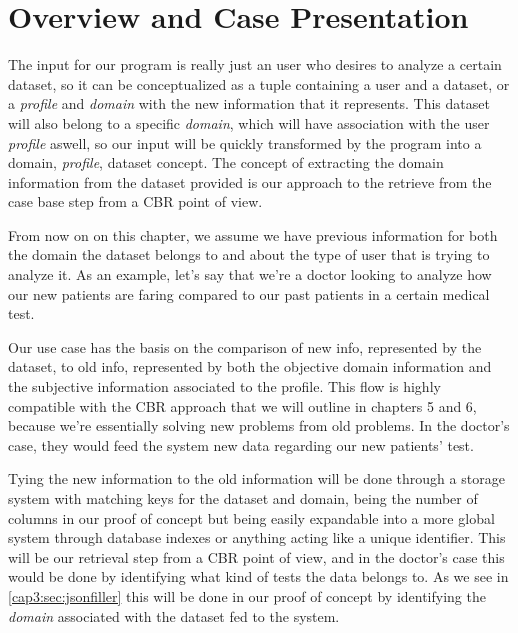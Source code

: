 \section{Overview and Case Presentation}
\label{cap2:sec:preparation}
The input for our program is really just an user who desires to analyze a certain dataset, so it can be conceptualized as a tuple containing a user and a dataset, or a \textit{profile} and \textit{domain} with the new information that it represents. This dataset will also belong to a specific \textit{domain}, which will have association with the user \textit{profile} aswell, so our input will be quickly transformed by the program into a domain, \textit{profile}, dataset concept. The concept of extracting the domain information from the dataset provided is our approach to the retrieve from the case base step from a CBR point of view.

From now on on this chapter, we assume we have previous information for both the domain the dataset belongs to and about the type of user that is trying to analyze it.
As an example, let's say that we're a doctor looking to analyze how our new patients are faring compared to our past patients in a certain medical test.

Our use case has the basis on the comparison of new info, represented by the dataset, to old info, represented by both the objective domain information and the subjective information associated to the profile. This flow is highly compatible with the CBR approach that we will outline in chapters 5 and 6, because we're essentially solving new problems from old problems.
In the doctor's case, they would feed the system new data regarding our new patients' test.

Tying the new information to the old information will be done through a storage system with matching keys for the dataset and domain, being the number of columns in our proof of concept but being easily expandable into a more global system through database indexes or anything acting like a unique identifier.
This will be our retrieval step from a CBR point of view, and in the doctor's case this would be done by identifying what kind of tests the data belongs to. 
As we see in \ref{cap3:sec:jsonfiller} this will be done in our proof of concept by identifying the \textit{domain} associated with the dataset fed to the system.


